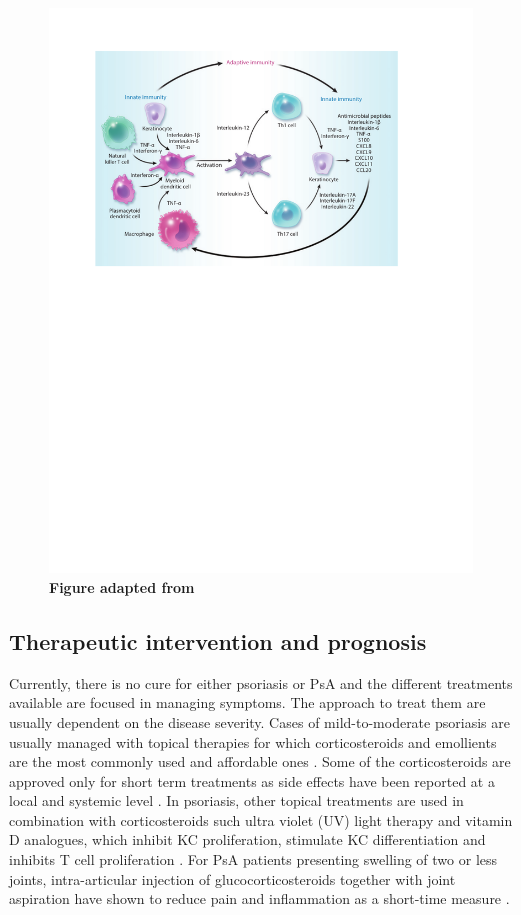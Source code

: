 \begin{figure}[H]
\includegraphics[width=\textwidth]{./Introduction/pdfs/PSO_adaptive_innate_immune_system_crosstalk.pdf}
\caption[Crosstalk between innate and adaptive immunity in psoriasis]{\textbf{Figure adapted from \parencite{Nestle2009}}}
\label{fig:PSO_immune_system_diagram}
\end{figure}

\subsection{Therapeutic intervention and prognosis}

Currently, there is no cure for either psoriasis or PsA and the different treatments available are focused in managing symptoms. The approach to treat them are usually dependent on the disease severity. Cases of mild-to-moderate psoriasis are usually managed with topical therapies for which corticosteroids and emollients are the most commonly used and affordable ones \parencite{Menter2009}. Some of the corticosteroids are approved only for short term treatments as side effects have been reported at a local and systemic level \parencite {Menter2009}. In psoriasis, other topical treatments are used in combination with corticosteroids such ultra violet (UV) light therapy and vitamin D analogues, which inhibit KC proliferation, stimulate KC differentiation and inhibits T cell proliferation \parencite{Rizova2001}. For PsA patients presenting swelling of two or less joints, intra-articular injection of glucocorticosteroids together with joint aspiration have shown to reduce pain and inflammation as a short-time measure \parencite{Coates2016}. 

